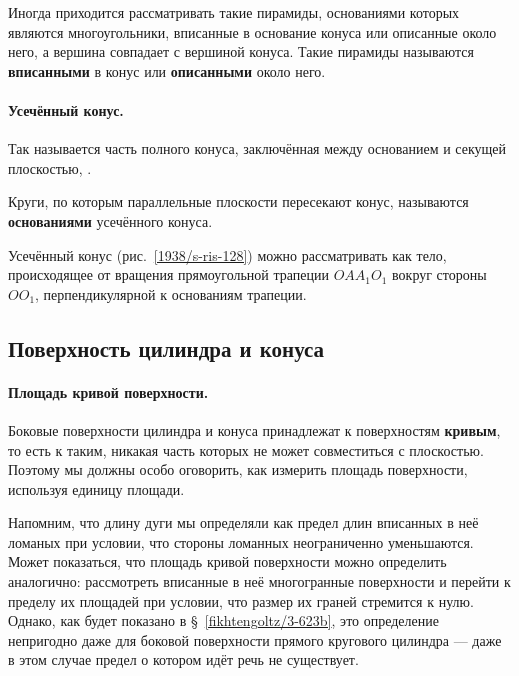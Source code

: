 Иногда приходится рассматривать такие пирамиды, основаниями которых являются многоугольники, вписанные в основание конуса или описанные около него, а вершина совпадает с вершиной конуса.
Такие пирамиды называются \textbf{вписанными} в конус или \textbf{описанными} около него.

\paragraph{Усечённый конус.}\label{1938/s110}
Так называется часть полного конуса, заключённая между основанием и секущей плоскостью, .

Круги, по которым параллельные плоскости пересекают конус, называются \textbf{основаниями} усечённого конуса.

Усечённый конус (рис.~\ref{1938/s-ris-128}) можно рассматривать как тело, происходящее от вращения прямоугольной трапеции $OAA_1O_1$ вокруг стороны $OO_1$, перпендикулярной к основаниям трапеции.

\subsection*{Поверхность цилиндра и конуса}

\paragraph{Площадь кривой поверхности.}\label{1938/s111}
Боковые поверхности цилиндра и конуса принадлежат к поверхностям {}\textbf{кривым}, то есть к таким, никакая часть которых не может совместиться с плоскостью.
Поэтому мы должны особо оговорить, как измерить площадь  поверхности, используя  единицу площади.

Напомним, что длину дуги мы определяли как предел длин вписанных в неё ломаных при условии, что стороны ломанных неограниченно уменьшаются.
Может показаться, что площадь кривой поверхности можно определить аналогично: рассмотреть вписанные в неё многогранные поверхности и перейти к пределу их площадей при условии, что размер их граней стремится к нулю.
Однако, как будет показано в §~\ref{fikhtengoltz/3-623b}, это определение непригодно даже для боковой поверхности прямого кругового цилиндра — даже в этом случае предел о котором идёт речь не существует.

